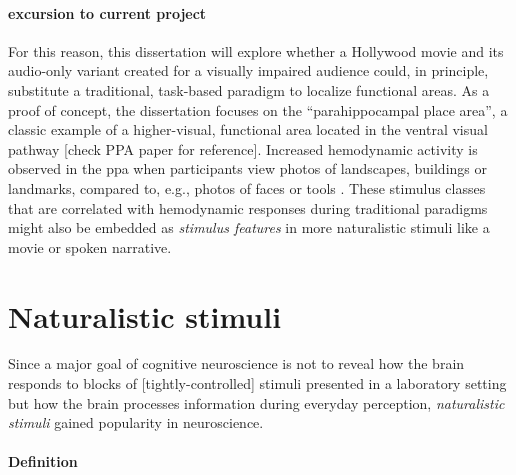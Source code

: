 \paragraph{excursion to current project}


%
For this reason, this dissertation will explore whether a Hollywood movie and
its audio-only variant created for a visually impaired audience could, in
principle, substitute a traditional, task-based paradigm to localize functional
areas.
%
As a proof of concept, the dissertation focuses on the ``parahippocampal place
area'', a classic example of a higher-visual, functional area
\citep{epstein1998ppa, epstein1999parahippocampal} located in the ventral visual
pathway [check PPA paper for reference].
Increased hemodynamic activity is observed in the \ac{ppa} when participants
view photos of landscapes, buildings or landmarks, compared to, e.g., photos of
faces or tools \citep[see reviews][]{epstein2014neural, aminoff2013role}.
%
These stimulus classes that are correlated with hemodynamic responses during
traditional paradigms might also be embedded as \textit{stimulus features} in
more naturalistic stimuli like a movie or spoken narrative.


\section{Naturalistic stimuli}
%
Since a major goal of cognitive neuroscience is not to reveal how the brain
responds to blocks of [tightly-controlled] stimuli presented in a laboratory
setting but how the brain processes information during everyday perception,
\textit{naturalistic stimuli} gained popularity in neuroscience.


\paragraph{Definition}


